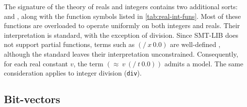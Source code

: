 The signature of the theory of reals and integers contains two additional sorts:  and  , along with the function symbols listed in \cref{tab:real-int-funs}.
Most of these functions are overloaded to operate uniformly on both integers and reals.
Their interpretation is standard, with the exception of division. 
Since SMT-LIB does not support partial functions, terms such as \((/~x~0.0)\) are well-defined , although the standard leaves their interpretation unconstrained.
Consequently, for each real constant \(v\), the term \((\approx~v~(/~t~0.0))\) admits a model.
The same consideration applies to integer division (\texttt{div}).

\subsection{Bit-vectors}


